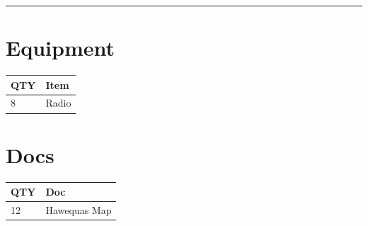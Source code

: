 \documentclass[10pt, A5]{article}
\begin{document}
\begin{framed}
\begin{minipage}{\textwidth}
\begin{multicols}{2}
		\vfill\null

		\end{multicols}

    \vspace{0.25cm}
        \hrule
        \vspace{0.25cm}

        \begin{multicols}{2}

		\section*{\faWrench \: Equipment}

		
	\begin{center}
			\begin{tabular}{p{2cm}p{4cm}}


				\textbf{QTY} & \textbf{Item} \\\toprule
												8&Radio\\\midrule
								\end{tabular}

			\end{center}

		
		\vfill\null
		\columnbreak

			\section*{\faFile \: Docs}
		 	\begin{center}
			\begin{tabular}{p{2cm}p{4cm}}

			\textbf{QTY} & \textbf{Doc} \\\toprule
										12&Hawequas Map\\\midrule
							\end{tabular}
			\end{center}
	

		\vfill\null

		\end{multicols}
\end{minipage}
\end{framed}
\end{document}
